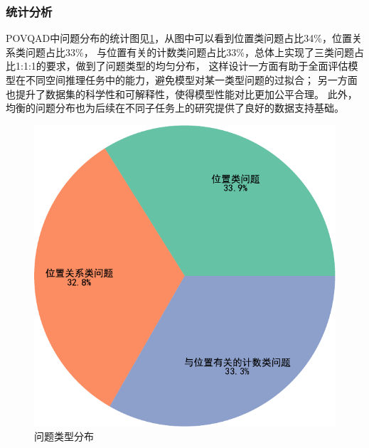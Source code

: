 \subsubsection{统计分析}
POVQAD中问题分布的统计图见\ref{fig:question_statistics}，从图中可以看到位置类问题占比34\%，位置关系类问题占比33\%，
与位置有关的计数类问题占比33\%，总体上实现了三类问题占比1:1:1的要求，做到了问题类型的均匀分布，
这样设计一方面有助于全面评估模型在不同空间推理任务中的能力，避免模型对某一类型问题的过拟合；
另一方面也提升了数据集的科学性和可解释性，使得模型性能对比更加公平合理。
此外，均衡的问题分布也为后续在不同子任务上的研究提供了良好的数据支持基础。
\begin{figure}[h]
    \centering
    \includegraphics[scale=0.6]{figures/三种类型问题占比-crop.pdf}
    \caption{问题类型分布}
    \label{fig:question_statistics}
\end{figure}
